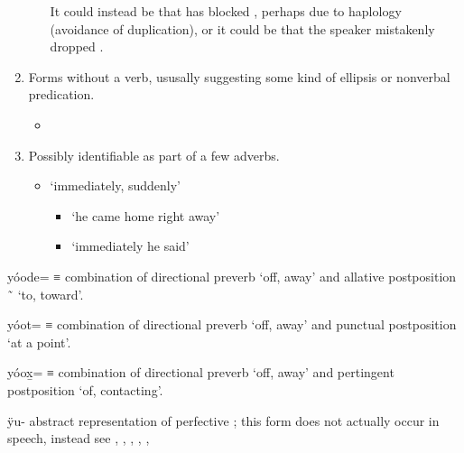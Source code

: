 \begin{morphdesc}[resume*=alphalist]
\begin{enumerate}
\begin{itemize}
			It could instead be that  has blocked ,
				perhaps due to haplology (avoidance of duplication),
				or it could be that the speaker mistakenly dropped .
		\end{itemize}
	\item	Forms without a verb, ususally suggesting some kind of ellipsis
			or nonverbal predication.
		\begin{itemize}
		\item	
		\end{itemize}
	\item	Possibly identifiable as part of a few adverbs.
		\begin{itemize}
		\item	{} ‘immediately, suddenly’
			\begin{itemize}
			\item	{} ‘he came home right away’
				\parencite[58]{naish:1966}
			\item	{} ‘immediately he said’
				\parencite[133]{naish:1966}
			\end{itemize}
		\end{itemize}
	\end{enumerate}

\item[yóode=]\label{m:yóode=}
	≡  combination of directional preverb  ‘off, away’
		and allative postposition  \~\  ‘to, toward’.

\item[yóot=]\label{m:yóot=}
	≡  combination of directional preverb  ‘off, away’
		and punctual postposition  ‘at a point’.

\item[yóox̱=]\label{m:yóox̱=}
	≡  combination of directional preverb  ‘off, away’
		and pertingent postposition  ‘of, contacting’.

\item[ÿu-]\label{m:ÿu-} 
	abstract representation of perfective ;
	this form does not actually occur in speech, instead see
		, , ,  , , 


\end{morphdesc}
